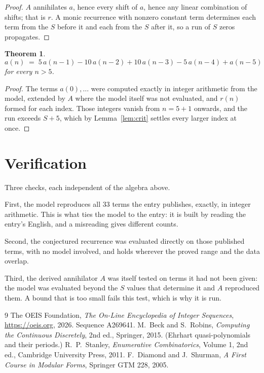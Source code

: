 \documentclass[11pt,a4paper]{article}
\theoremstyle{plain}
\newtheorem{theorem}{Theorem}
\theoremstyle{definition}
\begin{document}
\begin{proof}
$A$ annihilates $a$, hence every shift of $a$, hence any linear combination of shifts; that is
$r$. A monic recurrence with nonzero constant term determines each term from the $S$ before it
and each from the $S$ after it, so a run of $S$ zeros propagates.
\end{proof}

\begin{theorem}
\[
a(n)\;=\;5\,a(n-1) - 10\,a(n-2) + 10\,a(n-3) - 5\,a(n-4) + a(n-5)
\]
for every $n>5$.
\end{theorem}

\begin{proof}
The terms $a(0),\dots$ were computed exactly in integer arithmetic from the model, extended by
$A$ where the model itself was not evaluated, and $r(n)$ formed for each index. Those integers
vanish from $n=5+1$ onwards, and the run exceeds $S+5$, which by
Lemma~\ref{lem:crit} settles every larger index at once.
\end{proof}

\section{Verification}

Three checks, each independent of the algebra above.

First, the model reproduces all $33$ terms the entry publishes, exactly, in integer
arithmetic. This is what ties the model to the entry: it is built by reading the entry's
English, and a misreading gives different counts.

Second, the conjectured recurrence was evaluated directly on those published terms, with no
model involved, and holds wherever the proved range and the data overlap.

Third, the derived annihilator $A$ was itself tested on terms it had not been given: the model
was evaluated beyond the $S$ values that determine it and $A$ reproduced them. A bound that is
too small fails this test, which is why it is run.

\begin{thebibliography}{9}
 The OEIS Foundation, \emph{The On-Line Encyclopedia of Integer
Sequences}, \url{https://oeis.org}, 2026. Sequence A269641.
 M.~Beck and S.~Robins, \emph{Computing the Continuous Discretely},
2nd ed., Springer, 2015. (Ehrhart quasi-polynomials and their periods.)
 R.~P.~Stanley, \emph{Enumerative Combinatorics}, Volume 1, 2nd ed.,
Cambridge University Press, 2011.
 F.~Diamond and J.~Shurman, \emph{A First Course in Modular Forms},
Springer GTM 228, 2005.
\end{thebibliography}
\end{document}
